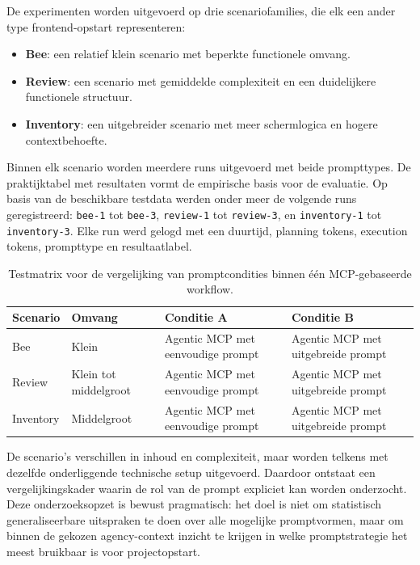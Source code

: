 De experimenten worden uitgevoerd op drie scenariofamilies, die elk een ander type frontend-opstart representeren:
\begin{itemize}
    \item \textbf{Bee}: een relatief klein scenario met beperkte functionele omvang.
    \item \textbf{Review}: een scenario met gemiddelde complexiteit en een duidelijkere functionele structuur.
    \item \textbf{Inventory}: een uitgebreider scenario met meer schermlogica en hogere contextbehoefte.
\end{itemize}

Binnen elk scenario worden meerdere runs uitgevoerd met beide prompttypes. De praktijktabel met resultaten vormt de empirische basis voor de evaluatie. Op basis van de beschikbare testdata werden onder meer de volgende runs geregistreerd: \texttt{bee-1} tot \texttt{bee-3}, \texttt{review-1} tot \texttt{review-3}, en \texttt{inventory-1} tot \texttt{inventory-3}. Elke run werd gelogd met een duurtijd, planning tokens, execution tokens, prompttype en resultaatlabel.

\begin{table}[h]
\small
\begin{tabularx}{\textwidth}{|l|X|X|X|}
\hline
\textbf{Scenario} & \textbf{Omvang} & \textbf{Conditie A} & \textbf{Conditie B} \\ \hline
Bee & Klein & Agentic MCP met eenvoudige prompt & Agentic MCP met uitgebreide prompt \\ \hline
Review & Klein tot middelgroot & Agentic MCP met eenvoudige prompt & Agentic MCP met uitgebreide prompt \\ \hline
Inventory & Middelgroot & Agentic MCP met eenvoudige prompt & Agentic MCP met uitgebreide prompt \\ \hline
\end{tabularx}
\caption{Testmatrix voor de vergelijking van promptcondities binnen één MCP-gebaseerde workflow.}
\label{tab:testmatrix}
\end{table}

De scenario's verschillen in inhoud en complexiteit, maar worden telkens met dezelfde onderliggende technische setup uitgevoerd. Daardoor ontstaat een vergelijkingskader waarin de rol van de prompt expliciet kan worden onderzocht. Deze onderzoeksopzet is bewust pragmatisch: het doel is niet om statistisch generaliseerbare uitspraken te doen over alle mogelijke promptvormen, maar om binnen de gekozen agency-context inzicht te krijgen in welke promptstrategie het meest bruikbaar is voor projectopstart.

